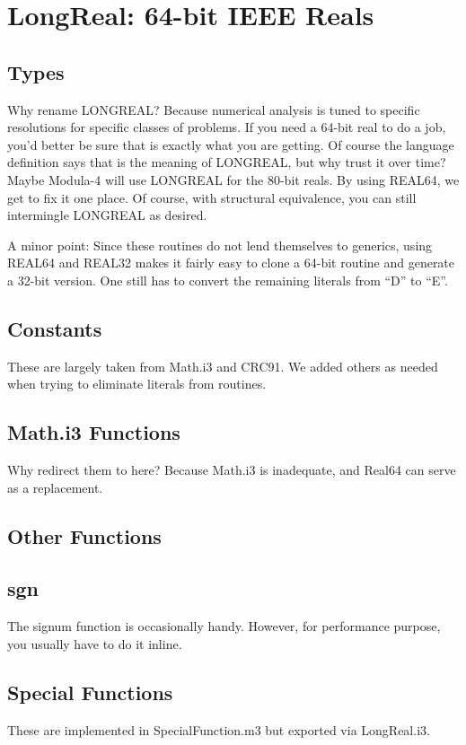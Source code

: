 \section{LongReal: 64-bit IEEE Reals}
\subsection{Types}
Why rename LONGREAL?  Because numerical analysis is tuned to specific
resolutions for specific classes of problems.  If you need a 64-bit real
to do a job, you'd better be sure that is exactly what you are getting.
Of course the language definition says that is the meaning of LONGREAL,
but why trust it over time?  Maybe Modula-4 will use LONGREAL for
the 80-bit reals.  By using REAL64, we get to fix it one place.
Of course, with structural equivalence, you can still intermingle
LONGREAL as desired.

A minor point:  Since these routines do not lend themselves to
generics, using REAL64 and REAL32 makes it fairly easy to clone
a 64-bit routine and generate a 32-bit version.  One still has to
convert the remaining literals from ``D'' to ``E''.

\subsection{Constants}
These are largely taken from Math.i3 and CRC91.
We added others as needed when trying
to eliminate literals from routines.

\subsection{Math.i3 Functions}
Why redirect them to here?  Because Math.i3 is inadequate, and
Real64 can serve as a replacement.

\subsection{Other Functions}
\subsection*{sgn}
The signum function is occasionally handy.  However, for
performance purpose, you usually have to do it inline.

\subsection{Special Functions}
These are implemented in SpecialFunction.m3 but exported via LongReal.i3.

